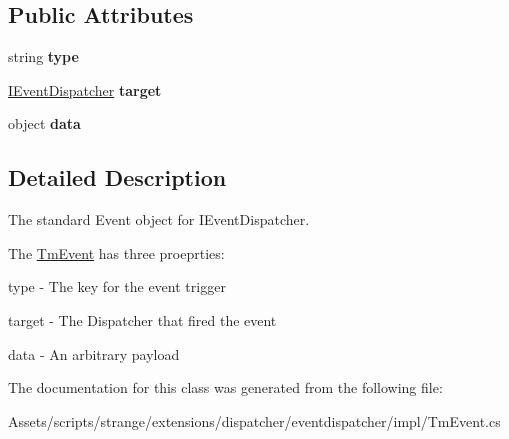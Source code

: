 \subsection*{Public Attributes}
\begin{DoxyCompactItemize}
\item 
\hypertarget{classstrange_1_1extensions_1_1dispatcher_1_1eventdispatcher_1_1impl_1_1_tm_event_a4bb988dca260371ca75078eb5613cb87}{string {\bfseries type}}\label{classstrange_1_1extensions_1_1dispatcher_1_1eventdispatcher_1_1impl_1_1_tm_event_a4bb988dca260371ca75078eb5613cb87}

\item 
\hypertarget{classstrange_1_1extensions_1_1dispatcher_1_1eventdispatcher_1_1impl_1_1_tm_event_a4fad0978eb6dd43804c35390f96c23a6}{\hyperlink{interfacestrange_1_1extensions_1_1dispatcher_1_1eventdispatcher_1_1api_1_1_i_event_dispatcher}{I\-Event\-Dispatcher} {\bfseries target}}\label{classstrange_1_1extensions_1_1dispatcher_1_1eventdispatcher_1_1impl_1_1_tm_event_a4fad0978eb6dd43804c35390f96c23a6}

\item 
\hypertarget{classstrange_1_1extensions_1_1dispatcher_1_1eventdispatcher_1_1impl_1_1_tm_event_a2a7919deb2f3212dd0bcbf2ce86624fb}{object {\bfseries data}}\label{classstrange_1_1extensions_1_1dispatcher_1_1eventdispatcher_1_1impl_1_1_tm_event_a2a7919deb2f3212dd0bcbf2ce86624fb}

\end{DoxyCompactItemize}


\subsection{Detailed Description}
The standard Event object for I\-Event\-Dispatcher. 

The \hyperlink{classstrange_1_1extensions_1_1dispatcher_1_1eventdispatcher_1_1impl_1_1_tm_event}{Tm\-Event} has three proeprties\-: 
\begin{DoxyItemize}
\item type -\/ The key for the event trigger 
\item target -\/ The Dispatcher that fired the event 
\item data -\/ An arbitrary payload 
\end{DoxyItemize}

The documentation for this class was generated from the following file\-:\begin{DoxyCompactItemize}
\item 
Assets/scripts/strange/extensions/dispatcher/eventdispatcher/impl/Tm\-Event.\-cs\end{DoxyCompactItemize}
